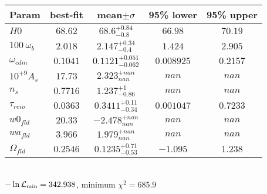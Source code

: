 \begin{tabular}{|l|c|c|c|c|} 
 \hline 
Param & best-fit & mean$\pm\sigma$ & 95\% lower & 95\% upper \\ \hline 
$H0$ &$68.62$ & $68.6_{-0.8}^{+0.84}$ & $66.98$ & $70.19$ \\ 
$100~\omega_{b }$ &$2.018$ & $2.147_{-0.4}^{+0.34}$ & $1.424$ & $2.905$ \\ 
$\omega_{cdm }$ &$0.1041$ & $0.1121_{-0.062}^{+0.051}$ & $0.008925$ & $0.2157$ \\ 
$10^{+9}A_{s }$ &$17.73$ & $2.323_{nan}^{+nan}$ & $nan$ & $nan$ \\ 
$n_{s }$ &$0.7716$ & $1.237_{-0.86}^{+1}$ & $nan$ & $nan$ \\ 
$\tau_{reio }$ &$0.0363$ & $0.3411_{-0.34}^{+0.11}$ & $0.001047$ & $0.7233$ \\ 
$w0_{fld }$ &$20.33$ & $-2.478_{nan}^{+nan}$ & $nan$ & $nan$ \\ 
$wa_{fld }$ &$3.966$ & $1.979_{nan}^{+nan}$ & $nan$ & $nan$ \\ 
$\Omega_{fld }$ &$0.2546$ & $0.1235_{-0.53}^{+0.71}$ & $-1.095$ & $1.238$ \\ 
\hline 
 \end{tabular} \\ 
$-\ln{\cal L}_\mathrm{min} =342.938$, minimum $\chi^2=685.9$ \\ 
